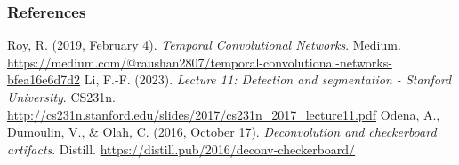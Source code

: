 \begin{vbframe}
\frametitle{References}
\footnotesize{
\begin{thebibliography}{99}
 Roy, R. (2019, February 4). \textit{Temporal Convolutional Networks}. Medium. \url{https://medium.com/@raushan2807/temporal-convolutional-networks-bfea16e6d7d2}
 Li, F.-F. (2023). \textit{Lecture 11: Detection and segmentation - Stanford University}. CS231n. \url{http://cs231n.stanford.edu/slides/2017/cs231n_2017_lecture11.pdf}
Odena, A., Dumoulin, V., \& Olah, C. (2016, October 17). \textit{Deconvolution and checkerboard artifacts}. Distill. \url{https://distill.pub/2016/deconv-checkerboard/}




\end{thebibliography}}
\end{vbframe}
